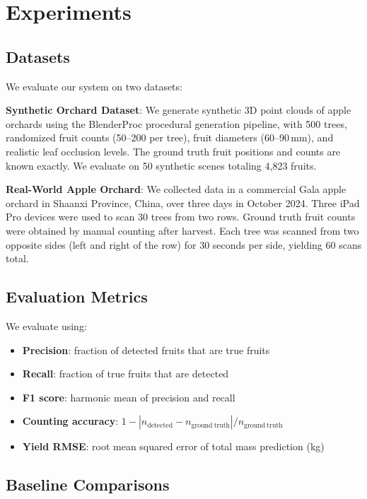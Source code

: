 \documentclass[12pt,a4paper]{article}
\begin{document}
\section{Experiments}

\subsection{Datasets}

We evaluate our system on two datasets:

\textbf{Synthetic Orchard Dataset}: We generate synthetic 3D point clouds of apple orchards using the BlenderProc procedural generation pipeline, with 500 trees, randomized fruit counts (50--200 per tree), fruit diameters (60--90\,mm), and realistic leaf occlusion levels. The ground truth fruit positions and counts are known exactly. We evaluate on 50 synthetic scenes totaling 4,823 fruits.

\textbf{Real-World Apple Orchard}: We collected data in a commercial Gala apple orchard in Shaanxi Province, China, over three days in October 2024. Three iPad Pro devices were used to scan 30 trees from two rows. Ground truth fruit counts were obtained by manual counting after harvest. Each tree was scanned from two opposite sides (left and right of the row) for 30 seconds per side, yielding 60 scans total.

\subsection{Evaluation Metrics}

We evaluate using:
\begin{itemize}
  \item \textbf{Precision}: fraction of detected fruits that are true fruits
  \item \textbf{Recall}: fraction of true fruits that are detected
  \item \textbf{F1 score}: harmonic mean of precision and recall
  \item \textbf{Counting accuracy}: $1 - |n_{\mathrm{detected}} - n_{\mathrm{ground\ truth}}| / n_{\mathrm{ground\ truth}}$
  \item \textbf{Yield RMSE}: root mean squared error of total mass prediction (kg)
\end{itemize}

\subsection{Baseline Comparisons}
\end{document}

